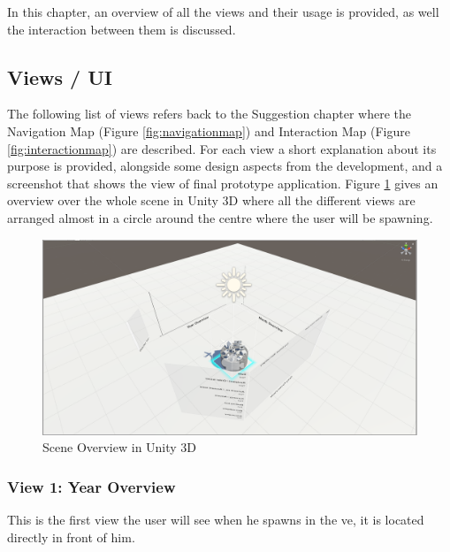 In this chapter, an overview of all the views and their usage is provided, as well the interaction between them is discussed.

\subsection{Views / UI}

The following list of views refers back to the Suggestion chapter where the Navigation Map (Figure \ref{fig:navigationmap}) and Interaction Map (Figure \ref{fig:interactionmap}) are described. For each view a short explanation about its purpose is provided, alongside some design aspects from the development, and a screenshot that shows the view of final prototype application. Figure \ref{fig:unityoverview} gives an overview over the whole scene in Unity 3D where all the different views are arranged almost in a circle around the centre where the user will be spawning.

\begin{figure}[h]
	\begin{center}
		\includegraphics[width=14cm]{03_Figures/08_Development/Unity_Overview.png}
		\caption{Scene Overview in Unity 3D}
		\label{fig:unityoverview}
	\end{center}
\end{figure}

\subsubsection{View 1: Year Overview}

This is the first view the user will see when he spawns in the \gls{ve}, it is located directly in front of him. \newline

